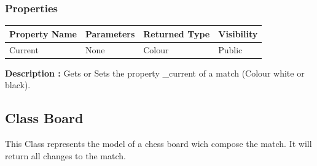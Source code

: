 \documentclass[12pt]{article}
\begin{document}
\subsubsection{Properties}

\begin{table}[H]
    \begin{tabular}{|l|l|l|l|}
    \hline
    \rowcolor[HTML]{EFEFEF} 
    \cellcolor[HTML]{EFEFEF}\textbf{Property Name} & \textbf{Parameters}  & \textbf{Returned Type} & \textbf{Visibility} \\ \hline
    Current                                        & None                 & Colour                 & Public              \\ \hline
    \end{tabular}
\end{table}

\textbf{Description :} Gets or Sets the property \_current of a match (Colour white or black).

\newpage


\subsection{Class Board}

This Class represents the model of a chess board wich compose the
match. It will return all changes to the match.
\end{document}
